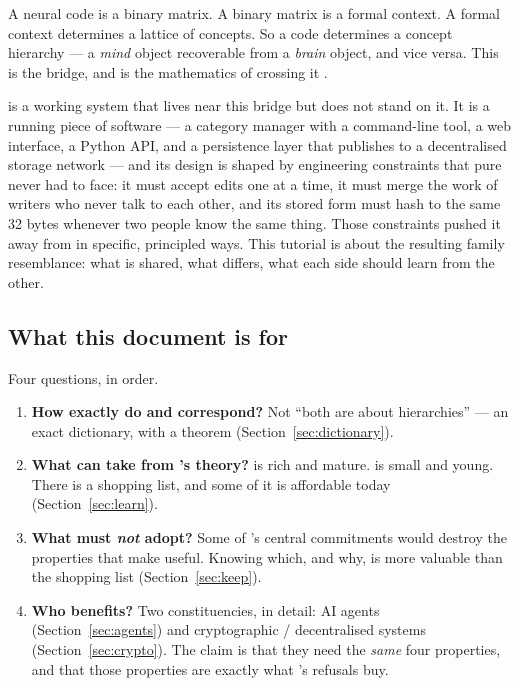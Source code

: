 \begin{keyidea}
A neural code is a binary matrix. A binary matrix is a formal context. A
formal context determines a lattice of concepts. So a code determines a
concept hierarchy --- a \emph{mind} object recoverable from a \emph{brain}
object, and vice versa. This is the bridge, and \fca{} is the mathematics of
crossing it \citep{endres2008}.
\end{keyidea}

\odag{} is a working system that lives near this bridge but does not stand on
it. It is a running piece of software --- a category manager with a
command-line tool, a web interface, a Python API, and a persistence layer that
publishes to a decentralised storage network --- and its design is shaped by
engineering constraints that pure \fca{} never had to face: it must accept
edits one at a time, it must merge the work of writers who never talk to each
other, and its stored form must hash to the same 32 bytes whenever two people
know the same thing. Those constraints pushed it away from \fca{} in specific,
principled ways. This tutorial is about the resulting family resemblance: what
is shared, what differs, what each side should learn from the other.

\subsection{What this document is for}

Four questions, in order.

\begin{enumerate}[label=\textbf{Q\arabic*.},leftmargin=2.6em]
\item \textbf{How exactly do \odag{} and \fca{} correspond?} Not
  ``both are about hierarchies'' --- an exact dictionary, with a theorem
  (Section~\ref{sec:dictionary}).
\item \textbf{What can \odag{} take from \fca{}'s theory?} \fca{} is rich and
  mature. \odag{} is small and young. There is a shopping list, and some of it
  is affordable today (Section~\ref{sec:learn}).
\item \textbf{What must \odag{} \emph{not} adopt?} Some of \fca{}'s central
  commitments would destroy the properties that make \odag{} useful. Knowing
  which, and why, is more valuable than the shopping list
  (Section~\ref{sec:keep}).
\item \textbf{Who benefits?} Two constituencies, in detail: AI agents
  (Section~\ref{sec:agents}) and cryptographic / decentralised systems
  (Section~\ref{sec:crypto}). The claim is that they need the \emph{same} four
  properties, and that those properties are exactly what \odag{}'s refusals
  buy.
\end{enumerate}

